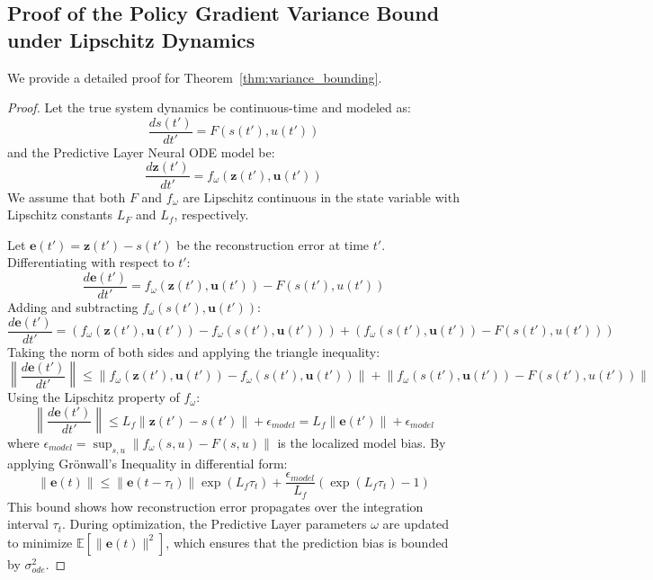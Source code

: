 \documentclass[manuscript, screen, review]{jair}
\begin{document}
\subsection{Proof of the Policy Gradient Variance Bound under Lipschitz Dynamics}\label{app:sub_variance}
We provide a detailed proof for Theorem~\ref{thm:variance_bounding}.
\begin{proof}
Let the true system dynamics be continuous-time and modeled as:
\begin{equation*}
    \frac{ds(t')}{dt'} = F(s(t'), u(t'))
\end{equation*}
and the Predictive Layer Neural ODE model be:
\begin{equation*}
    \frac{d\mathbf{z}(t')}{dt'} = f_\omega(\mathbf{z}(t'), \mathbf{u}(t'))
\end{equation*}
We assume that both $F$ and $f_\omega$ are Lipschitz continuous in the state variable with Lipschitz constants $L_F$ and $L_f$, respectively.

Let $\mathbf{e}(t') = \mathbf{z}(t') - s(t')$ be the reconstruction error at time $t'$. Differentiating with respect to $t'$:
\begin{equation*}
    \frac{d\mathbf{e}(t')}{dt'} = f_\omega(\mathbf{z}(t'), \mathbf{u}(t')) - F(s(t'), u(t'))
\end{equation*}
Adding and subtracting $f_\omega(s(t'), \mathbf{u}(t'))$:
\begin{equation*}
    \frac{d\mathbf{e}(t')}{dt'} = \left( f_\omega(\mathbf{z}(t'), \mathbf{u}(t')) - f_\omega(s(t'), \mathbf{u}(t')) \right) + \left( f_\omega(s(t'), \mathbf{u}(t')) - F(s(t'), u(t')) \right)
\end{equation*}
Taking the norm of both sides and applying the triangle inequality:
\begin{equation*}
    \left\| \frac{d\mathbf{e}(t')}{dt'} \right\| \le \left\| f_\omega(\mathbf{z}(t'), \mathbf{u}(t')) - f_\omega(s(t'), \mathbf{u}(t')) \right\| + \left\| f_\omega(s(t'), \mathbf{u}(t')) - F(s(t'), u(t')) \right\|
\end{equation*}
Using the Lipschitz property of $f_\omega$:
\begin{equation*}
    \left\| \frac{d\mathbf{e}(t')}{dt'} \right\| \le L_f \| \mathbf{z}(t') - s(t') \| + \epsilon_{model} = L_f \| \mathbf{e}(t') \| + \epsilon_{model}
\end{equation*}
where $\epsilon_{model} = \sup_{s, u} \| f_\omega(s, u) - F(s, u) \|$ is the localized model bias. By applying Grönwall's Inequality in differential form:
\begin{equation}
    \| \mathbf{e}(t) \| \le \| \mathbf{e}(t-\tau_t) \| \exp(L_f \tau_t) + \frac{\epsilon_{model}}{L_f} \left( \exp(L_f \tau_t) - 1 \right)
\end{equation}
This bound shows how reconstruction error propagates over the integration interval $\tau_t$. During optimization, the Predictive Layer parameters $\omega$ are updated to minimize $\mathbb{E}[\|\mathbf{e}(t)\|^2]$, which ensures that the prediction bias is bounded by $\sigma_{ode}^2$.


\end{proof}
\end{document}
